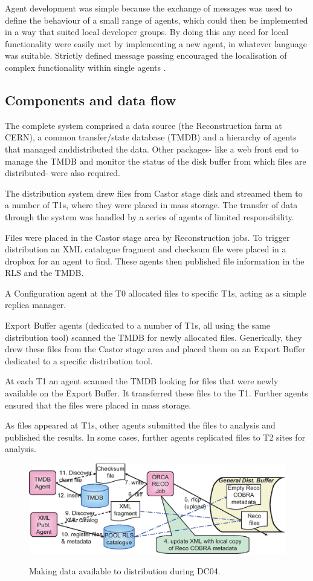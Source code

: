 \documentclass{cmspaper}
\begin{document}
Agent development was simple because the exchange of messages was used to define the behaviour of a small range of agents, which could then be implemented in a way that suited local developer groups. By doing this any need for local functionality were easily met by implementing a new agent, in whatever language was suitable. Strictly defined message passing encouraged the localisation of complex functionality within single agents \cite{B03}.

\subsection{Components and data flow}
The complete system comprised a data source (the Reconstruction farm at CERN), a common transfer/state database (TMDB) and a hierarchy of agents that managed anddistributed the data. Other packages- like a web front end to manage the TMDB and monitor the status of the disk buffer from which files are distributed- were also required. 

The distribution system drew files from Castor stage disk and streamed them to a number of T1s, where they were placed in mass storage. The transfer of data through the system was handled by a series of agents of limited  responsibility.

Files were placed in the Castor stage area by Reconstruction jobs. To trigger  distribution an XML catalogue fragment and checksum file were placed in a dropbox for an agent to find. These agents then published file information in the RLS and the TMDB.

A Configuration agent at the T0 allocated files to specific T1s, acting as a simple replica manager.

Export Buffer agents (dedicated to a number of T1s, all using the same distribution tool) scanned the TMDB for newly allocated files. Generically, they drew these files from the Castor stage area and placed them on an Export Buffer dedicated to a specific distribution tool.

At each T1 an agent scanned the TMDB looking for files that were newly available on the Export Buffer. It transferred these files to the T1. Further agents ensured that the files were placed in mass storage.

As files appeared at T1s, other agents submitted the files to analysis and published the results. In some cases, further agents replicated files to T2 sites for analysis.

\begin{figure}[tbp]
\centering
\includegraphics[angle = 90]{T0-flow.eps} 
\label{fig:flow1}
\caption{Making data available to distribution during DC04.}
\end{figure}
\end{document}
